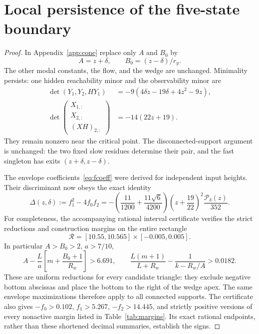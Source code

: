 \section{Local persistence of the five-state boundary}\label{app:unfolding}
\begin{proof}
In Appendix~\ref{app:cone} replace only $A$ and $B_0$ by
\begin{equation}
 A=z+\delta,\qquad B_0=(z-\delta)/r_y.
\end{equation}
The other modal constants, the flow, and the wedge are unchanged.
Minimality persists: one hidden reachability minor and the observability
minor are
\begin{align}
 \det(Y_1,Y_2,HY_1)&=-9(4\delta z-19\delta+4z^2-9z),\\
 \det\begin{pmatrix}X_{1,:}\\X_{2,:}\\(XH)_{2,:}\end{pmatrix}
 &=-14(22z+19).
\end{align}
They remain nonzero near the critical point.  The disconnected-support
argument is unchanged: the two fixed slow residues determine their pair,
and the fast singleton has exits $(z+\delta,z-\delta)$.

The envelope coefficients~\eqref{eq:fcoeff} were derived for independent
input heights.  Their discriminant now obeys the exact identity
\begin{equation}
 \Delta(z,\delta):=f_1^2-4f_0f_2
 =-\left(\frac{11}{1200}+\frac{11\sqrt6}{4200}\right)
 \left(z+\frac{19}{22}\right)^2\frac{\mathcal P_\delta(z)}{352}.
 \label{eq:perturbeddisc}
\end{equation}
For completeness, the accompanying rational interval certificate verifies
the strict reductions and construction margins on the entire rectangle
\begin{equation}
 \mathcal R=[10.55,10.565]\times[-0.005,0.005].\label{eq:unfoldrect}
\end{equation}
In particular $A>B_0>2$, $a>7/10$,
\begin{equation}
 A-\frac{L}{a}\left[m+\frac{B_0+1}{R_w}\right]>6.691,
 \qquad
 \frac{L(m+1)}{L+R_w}-\frac1{k-R_w/A}>0.0182.
\end{equation}
These are uniform reductions for every candidate triangle: they exclude
negative bottom abscissas and place the bottom to the right of the wedge
apex.  The same envelope maximizations therefore apply to all connected
supports.  The certificate also gives $-f_0>0.102$, $f_1>5.267$,
$-f_2>14.445$, and strictly positive versions of every nonactive margin
listed in Table~\ref{tab:margins}.  Its exact rational endpoints, rather
than these shortened decimal summaries, establish the signs.


\end{proof}
